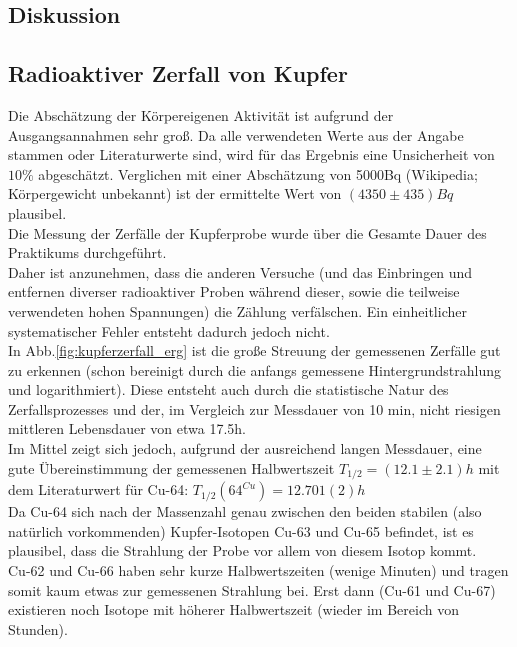 \documentclass[12pt,a4paper]{article}
\begin{document}
\begin{multicols}{2}
\pagebreak
\section{Diskussion}

\subsection{Radioaktiver Zerfall von Kupfer}
Die Abschätzung der Körpereigenen Aktivität ist aufgrund der Ausgangsannahmen sehr groß. Da alle verwendeten Werte aus der Angabe stammen oder Literaturwerte sind, wird für das Ergebnis eine Unsicherheit von $10\%$ abgeschätzt. Verglichen mit einer Abschätzung von 5000Bq (Wikipedia; Körpergewicht unbekannt) ist der ermittelte Wert von $(4350 \pm 435) Bq$ plausibel.\\

\noindent Die Messung der Zerfälle der Kupferprobe wurde über die Gesamte Dauer des Praktikums durchgeführt.\\
Daher ist anzunehmen, dass die anderen Versuche (und das Einbringen und entfernen diverser radioaktiver Proben während dieser, sowie die teilweise verwendeten hohen Spannungen) die Zählung verfälschen. Ein einheitlicher systematischer Fehler entsteht dadurch jedoch nicht.\\

\noindent In Abb.\ref{fig:kupferzerfall_erg} ist die große Streuung der gemessenen Zerfälle gut zu erkennen (schon bereinigt durch die anfangs gemessene Hintergrundstrahlung und logarithmiert). Diese entsteht auch durch die statistische Natur des Zerfallsprozesses und der, im Vergleich zur Messdauer von 10 min, nicht riesigen mittleren Lebensdauer von etwa 17.5h.\\

\noindent Im Mittel zeigt sich jedoch, aufgrund der ausreichend langen Messdauer, eine gute Übereinstimmung der gemessenen Halbwertszeit $T_{1/2} = (12.1 \pm 2.1)h$ mit dem
Literaturwert für Cu-64: $T_{1/2} ({64}^{Cu}) = 12.701(2) h$\\
Da Cu-64 sich nach der Massenzahl genau zwischen den beiden stabilen (also natürlich vorkommenden) Kupfer-Isotopen Cu-63 und Cu-65 befindet, ist es plausibel, dass die Strahlung der Probe vor allem von diesem Isotop kommt.\\
Cu-62 und Cu-66 haben sehr kurze Halbwertszeiten (wenige Minuten) und tragen somit kaum etwas zur gemessenen Strahlung bei. Erst dann (Cu-61 und Cu-67) existieren noch Isotope mit höherer Halbwertszeit (wieder im Bereich von Stunden).


\end{multicols}
\end{document}
